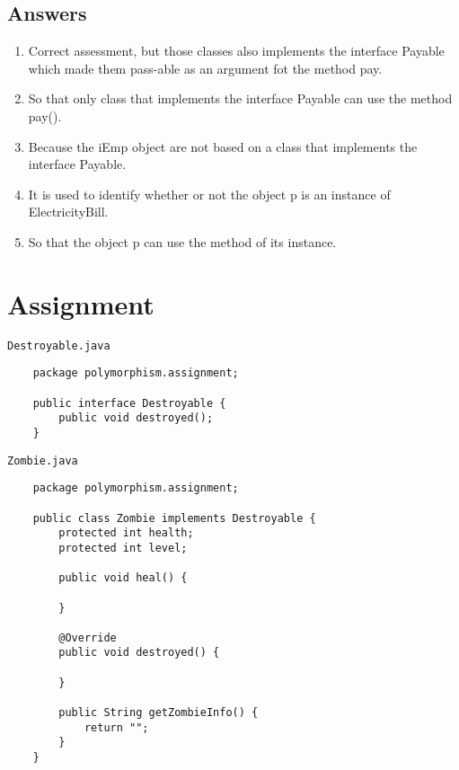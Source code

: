 \documentclass[12pt,titlepage]{article}
\begin{document}
\subsection{Answers}
\begin{enumerate}
    \item Correct assessment, but those classes also implements the interface Payable which made them pass-able as an argument fot the method pay.
    \item So that only class that implements the interface Payable can use the method pay().
    \item Because the iEmp object are not based on a class that implements the interface Payable.
    \item It is used to identify whether or not the object p is an instance of ElectricityBill.
    \item So that the object p can use the method of its instance.
\end{enumerate}

\newpage

\section{Assignment}

\texttt{Destroyable.java}
\begin{verbatim}
    package polymorphism.assignment;

    public interface Destroyable {
        public void destroyed();
    }
\end{verbatim}

\texttt{Zombie.java}
\begin{verbatim}
    package polymorphism.assignment;

    public class Zombie implements Destroyable {
        protected int health;
        protected int level;

        public void heal() {
            
        }

        @Override
        public void destroyed() {
            
        }

        public String getZombieInfo() {
            return "";
        }
    }
\end{verbatim}
\end{document}
